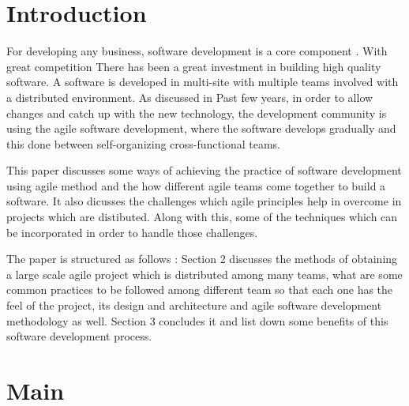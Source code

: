 \documentclass[sigconf]{acmart}
\begin{document}
\section{Introduction}
For developing any business, software development is a core component \cite{HenrikK}. With great competition There has been a great investment in building high quality software. A software is developed in multi-site with multiple teams involved with a distributed environment. As discussed in \cite{4638656}Past few years, in order to allow changes and catch up with the new technology, the development community is using the agile software development, where the software develops gradually and this done between self-organizing cross-functional teams\cite{Moe:2014:NLD:2652524.2652584}. 

This paper discusses some ways of achieving the practice of software development using agile method and the how different agile teams come together to build a software\cite{SunitP}. It also dicusses the challenges which agile principles help in overcome in projects which are distibuted. Along with this, some of the techniques which can be incorporated in order to handle those challenges.

The paper is structured as follows : Section 2 discusses the methods of obtaining a large scale agile project which is distributed among many teams, what are some common practices to be followed among different team so that each one has the feel of the project, its design and architecture\cite{de2010conducting} and agile software development methodology as well. Section 3 concludes it and list down some benefits of this software development process.

\section{Main}
\end{document}
